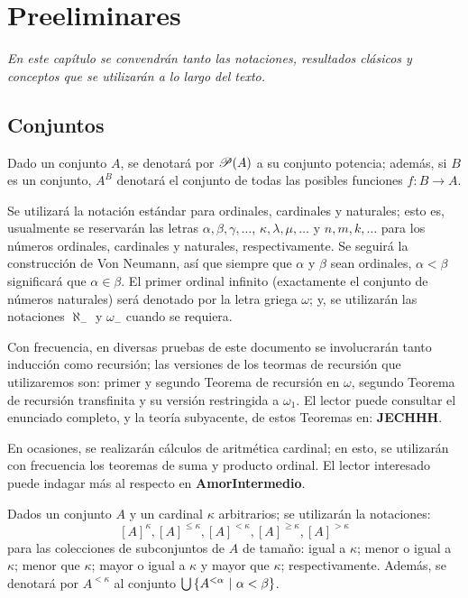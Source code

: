 \setcounter{chapter}{-1}
\chapter{Preeliminares}

\emph{\small En este capítulo se convendrán tanto las notaciones, resultados clásicos y conceptos que se utilizarán a lo largo del texto.}

\section{Conjuntos}

Dado un conjunto $A$, se denotará por $\mathscr{P}(A)$ a su conjunto potencia; además, si $B$ es un conjunto, $A^B$ denotará el conjunto de todas las posibles funciones $f:B \to A$.

Se utilizará la notación estándar para ordinales, cardinales y naturales; esto es, usualmente se reservarán las letras $\alpha,\beta,\gamma,\dots$, $\kappa,\lambda,\mu,\dots$ y $n,m,k,\dots$ para los números ordinales, cardinales y naturales, respectivamente. Se seguirá la construcción de Von Neumann, así que siempre que $\alpha$ y $\beta$ sean ordinales, $\alpha<\beta$ significará que $\alpha \in \beta$. El primer ordinal infinito (exactamente el conjunto de números naturales) será denotado por la letra griega $\omega$; y, se utilizarán las notaciones $\aleph_-$ y $\omega_-$ cuando se requiera.

Con frecuencia, en diversas pruebas de este documento se involucrarán tanto inducción como recursión; las versiones de los teormas de recursión que utilizaremos son: primer y segundo Teorema de recursión en $\omega$, segundo Teorema de recursión transfinita y su versión restringida a $\omega_1$. El lector puede consultar el enunciado completo, y la teoría subyacente, de estos Teoremas en: \textbf{JECHHH}.

En ocasiones, se realizarán cálculos de aritmética cardinal; en esto, se utilizarán con frecuencia los teoremas de suma y producto ordinal. El lector interesado puede indagar más al respecto en \textbf{AmorIntermedio}.

Dados un conjunto $A$ y un cardinal $\kappa$ arbitrarios; se utilizarán la notaciones:
\[[A]^\kappa,[A]^{\leq \kappa},[A]^{< \kappa},[A]^{\geq \kappa},[A]^{> \kappa}\]
para las colecciones de subconjuntos de $A$ de tamaño: igual a $\kappa$; menor o igual a $\kappa$; menor que $\kappa$; mayor o igual a $\kappa$ y mayor que $\kappa$; respectivamente. Además, se denotará por $A^{<\kappa}$ al conjunto $\mbox{$\bigcup$}\, \{A^{<\alpha} \text{ $|$ } \alpha < \beta\}$.

